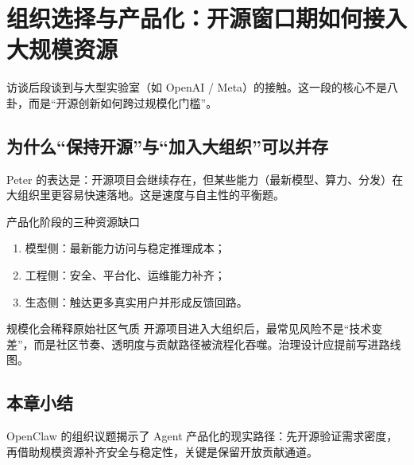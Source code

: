 \section{组织选择与产品化：开源窗口期如何接入大规模资源}

访谈后段谈到与大型实验室（如 OpenAI / Meta）的接触。这一段的核心不是八卦，而是“开源创新如何跨过规模化门槛”。

\subsection{为什么“保持开源”与“加入大组织”可以并存}

Peter 的表达是：开源项目会继续存在，但某些能力（最新模型、算力、分发）在大组织里更容易快速落地。这是速度与自主性的平衡题。

\begin{importantbox}{产品化阶段的三种资源缺口}
\begin{enumerate}
    \item 模型侧：最新能力访问与稳定推理成本；
    \item 工程侧：安全、平台化、运维能力补齐；
    \item 生态侧：触达更多真实用户并形成反馈回路。
\end{enumerate}
\end{importantbox}

\begin{warningbox}{规模化会稀释原始社区气质}
开源项目进入大组织后，最常见风险不是“技术变差”，而是社区节奏、透明度与贡献路径被流程化吞噬。治理设计应提前写进路线图。
\end{warningbox}

\subsection{本章小结}
OpenClaw 的组织议题揭示了 Agent 产品化的现实路径：先开源验证需求密度，再借助规模资源补齐安全与稳定性，关键是保留开放贡献通道。


